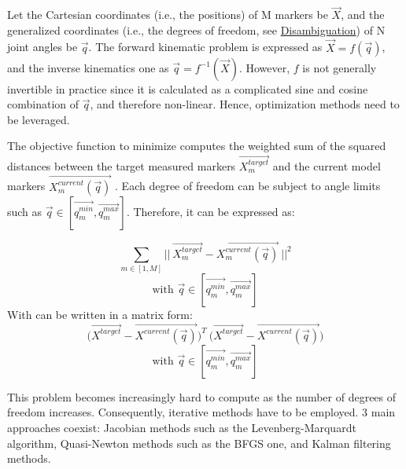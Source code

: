 Let the Cartesian coordinates (i.e., the positions) of M markers be $\overrightarrow{X}$, and the generalized coordinates (i.e., the degrees of freedom, see \hyperlink{Ann:gloss}{Disambiguation}) of N joint angles be $\overrightarrow{q}$. The forward kinematic problem is expressed as $\overrightarrow{X}=f(\overrightarrow{q})$, and the inverse kinematics one as $\overrightarrow{q}=f^{-1}(\overrightarrow{X})$. However, $f$ is not generally invertible in practice since it is calculated as a complicated sine and cosine combination of $\overrightarrow{q}$, and therefore non-linear. Hence, optimization methods need to be leveraged. 

The objective function to minimize computes the weighted sum of the squared distances between the target measured markers $\overrightarrow{X^{target}_m}$ and the current model markers $\overrightarrow{X^{current}_m(\overrightarrow{q})}$ \cite{Lu1999}. Each degree of freedom can be subject to angle limits such as $\overrightarrow{q} \in [ \overrightarrow{q_m^{min}},\overrightarrow{q_m^{max}} ]$. Therefore, it can be expressed as:

\begin{equation}
  \sum_{m \in [1,M]}
  || \  \overrightarrow{X^{target}_m} - \overrightarrow{X^{current}_m(\overrightarrow{q})} \ ||^2
\end{equation}
\begin{equation*}
  \text{with } \overrightarrow{q} \in [ \overrightarrow{q_m^{min}},\overrightarrow{q_m^{max}} ]
\end{equation*} 
With can be written in a matrix form:
\begin{equation}\label{eq_obj_ik}
  \bigl(\overrightarrow{X^{target}} - \overrightarrow{X^{current}(\overrightarrow{q})}\bigr)^T \ 
  \bigl(\overrightarrow{X^{target}} - \overrightarrow{X^{current}(\overrightarrow{q})}\bigr)
\end{equation}
\begin{equation*}
  \text{with } \overrightarrow{q} \in [ \overrightarrow{q_m^{min}},\overrightarrow{q_m^{max}} ]
\end{equation*} 

This problem becomes increasingly hard to compute as the number of degrees of freedom increases. Consequently, iterative methods have to be employed. 3 main approaches coexist: Jacobian methods such as the Levenberg-Marquardt algorithm, Quasi-Newton methods such as the BFGS one, and Kalman filtering methods.


